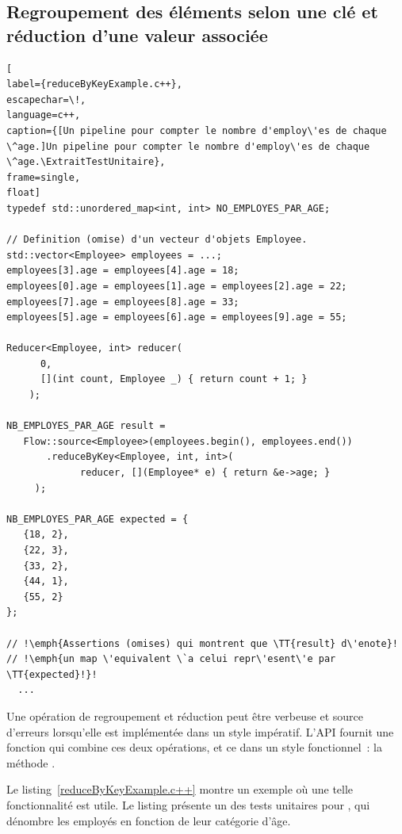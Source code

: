 \subsection{Regroupement des \'el\'ements selon une cl\'e et r\'eduction d'une valeur associ\'ee}

\label{reduceByKey.sect}

\begin{lstlisting}[
label={reduceByKeyExample.c++},
escapechar=\!,
language=c++,
caption={[Un pipeline pour compter le nombre d'employ\'es de chaque \^age.]Un pipeline pour compter le nombre d'employ\'es de chaque \^age.\ExtraitTestUnitaire},
frame=single,
float]
typedef std::unordered_map<int, int> NO_EMPLOYES_PAR_AGE;

// Definition (omise) d'un vecteur d'objets Employee.
std::vector<Employee> employees = ...; 
employees[3].age = employees[4].age = 18;
employees[0].age = employees[1].age = employees[2].age = 22;
employees[7].age = employees[8].age = 33;
employees[5].age = employees[6].age = employees[9].age = 55;

Reducer<Employee, int> reducer(
      0,
      [](int count, Employee _) { return count + 1; }
    );

NB_EMPLOYES_PAR_AGE result = 
   Flow::source<Employee>(employees.begin(), employees.end())
       .reduceByKey<Employee, int, int>(
             reducer, [](Employee* e) { return &e->age; }
     );
    
NB_EMPLOYES_PAR_AGE expected = {
   {18, 2},
   {22, 3},
   {33, 2},
   {44, 1},
   {55, 2}
};

// !\emph{Assertions (omises) qui montrent que \TT{result} d\'enote}!
// !\emph{un map \'equivalent \`a celui repr\'esent\'e par \TT{expected}!}!
  ...
\end{lstlisting}

Une op\'eration de regroupement et r\'eduction peut \^etre verbeuse et source d'erreurs lorsqu'elle est impl\'ement\'ee dans un style imp\'eratif. L'{API} fournit une fonction qui combine ces deux op\'erations, et ce  dans un style fonctionnel~: la m\'ethode .

Le listing~\ref{reduceByKeyExample.c++} montre un exemple o\`u une telle fonctionnalit\'e est utile. Le listing pr\'esente un des tests unitaires pour , qui d\'enombre les employ\'es en fonction de leur cat\'egorie d'\^age. 

